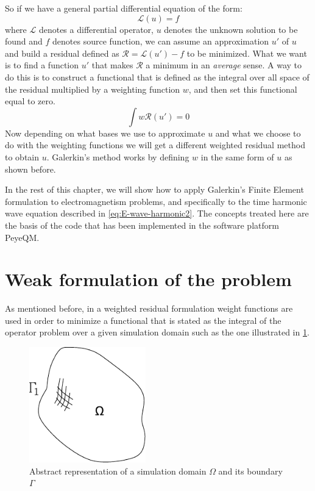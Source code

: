 So if we have a general partial differential equation of the form: 
\begin{equation}
\mathcal{L}(u) = f
\label{eq:general_form_of_DE}
\end{equation}  where $\mathcal{L}$ denotes a differential operator, $u$ denotes the unknown solution to be found and $f$ denotes source function, we can assume an approximation $u'$ of $u$ and build a residual defined as $\mathcal{R} = \mathcal{L}(u')-f$ to be minimized. What we want is to find a function $u'$ that makes $\mathcal{R}$ a minimum in an \emph{average} sense. A way to do this is to construct a functional that is defined as the integral over all space of the residual multiplied by a weighting function $w$, and then set this functional equal to zero. 
\begin{equation}
\int w \mathcal{R}(u') = 0
\end{equation}
Now depending on what bases we use to approximate $u$ and what we choose to do with the weighting functions we will get a different weighted residual method to obtain $u$. 
Galerkin's method works by defining $w$ in the same form of $u$ as shown before.

In the rest of this chapter, we will show how to apply Galerkin's Finite Element formulation to electromagnetism problems, and specifically to the time harmonic wave equation described in \ref{eq:E-wave-harmonic2}. The concepts treated here are the basis of the code that has been implemented in the software platform PeyeQM.

\section{Weak formulation of the problem}

As mentioned before, in a weighted residual formulation weight functions  are used in order to minimize a functional that is stated as the integral of the operator problem over a given  simulation domain such as the one illustrated in \ref{fig:domain}. 

\begin{figure}[h]
\centering
\includegraphics[height=5cm]{./img/dominio.pdf}
\caption{Abstract representation of a simulation domain $\Omega$ and its boundary $\Gamma$}
\label{fig:domain}
\end{figure}

